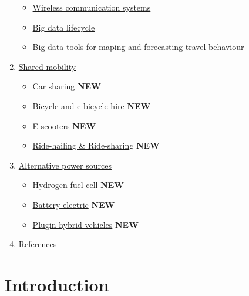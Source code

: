 \documentclass[
]{book}
\providecommand{\tightlist}{%
  \setlength{\itemsep}{0pt}\setlength{\parskip}{0pt}}
\begin{document}
\begin{enumerate}
  \begin{itemize}
  \tightlist
  \item
    \protect\hyperlink{wireless_com}{Wireless communication systems}
  \item
    \protect\hyperlink{bd_life}{Big data lifecycle}
  \item
    \protect\hyperlink{bd_tool_maping}{Big data tools for maping and forecasting travel behaviour}
  \end{itemize}
\item
  \protect\hyperlink{shared}{Shared mobility}

  \begin{itemize}
  \tightlist
  \item
    \protect\hyperlink{car_sharing}{Car sharing} \textbf{NEW}
  \item
    \protect\hyperlink{bike_sharing}{Bicycle and e-bicycle hire} \textbf{NEW}
  \item
    \protect\hyperlink{scooters}{E-scooters} \textbf{NEW}
  \item
    \protect\hyperlink{ride_hailing}{Ride-hailing \& Ride-sharing} \textbf{NEW}
  \end{itemize}
\item
  \protect\hyperlink{alternative}{Alternative power sources}

  \begin{itemize}
  \tightlist
  \item
    \protect\hyperlink{FCEV}{Hydrogen fuel cell} \textbf{NEW}
  \item
    \protect\hyperlink{bev}{Battery electric} \textbf{NEW}
  \item
    \protect\hyperlink{plugin_hybrid}{Plugin hybrid vehicles} \textbf{NEW}
  \end{itemize}
\item
  \protect\hyperlink{reference}{References}
\end{enumerate}

\hypertarget{intro}{%
\chapter{Introduction}\label{intro}}
\end{document}
